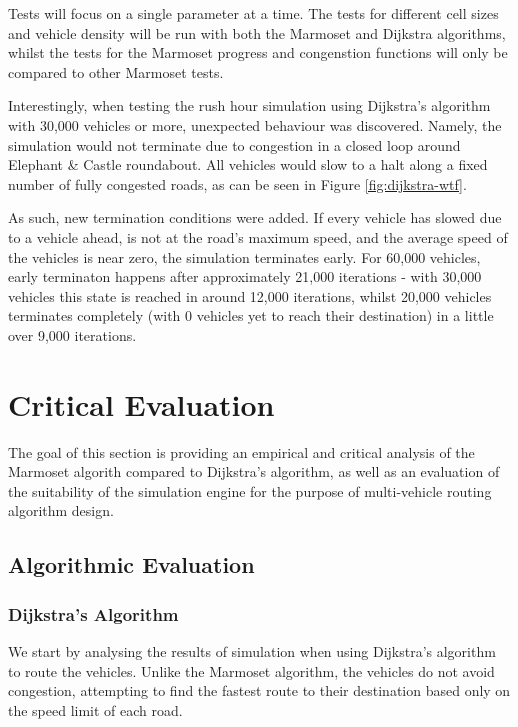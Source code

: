 \documentclass[ %
                    author={Alexander Hill},
                supervisor={Dr. Benjamin Sach},
                    degree={MEng},
                     title={MARMOSET},
                  subtitle={Multi-Agent Route Management using Online Simulation for Efficient Transportation},
                      type={research},
                      year={2016} ]{dissertation}
\begin{document}
Tests will focus on a single parameter at a time. The tests for different cell
sizes and vehicle density will be run with both the Marmoset and Dijkstra
algorithms, whilst the tests for the Marmoset progress and congenstion functions
will only be compared to other Marmoset tests.

Interestingly, when testing the rush hour simulation using Dijkstra's algorithm
with 30,000 vehicles or more, unexpected behaviour was discovered. Namely, the
simulation would not terminate due to congestion in a closed loop around
Elephant \& Castle roundabout. All vehicles would slow to a halt along a fixed
number of fully congested roads, as can be seen in Figure \ref{fig:dijkstra-wtf}.

As such, new termination conditions were added. If every vehicle has slowed due
to a vehicle ahead, is not at the road's maximum speed, and the average speed of
the vehicles is near zero, the simulation terminates early. For 60,000 vehicles,
early terminaton happens after approximately 21,000 iterations - with 30,000
vehicles this state is reached in around 12,000 iterations, whilst 20,000
vehicles terminates completely (with 0 vehicles yet to reach their destination)
in a little over 9,000 iterations.


\chapter{Critical Evaluation}
\label{chap:evaluation}

The goal of this section is providing an empirical and critical analysis of the
Marmoset algorith compared to Dijkstra's algorithm, as well as an evaluation of
the suitability of the simulation engine for the purpose of multi-vehicle
routing algorithm design.

\section{Algorithmic Evaluation}

\subsection{Dijkstra's Algorithm}\label{sec:density}

We start by analysing the results of simulation when using Dijkstra's algorithm to
route the vehicles. Unlike the Marmoset algorithm, the vehicles do not avoid
congestion, attempting to find the fastest route to their destination based only
on the speed limit of each road.
\end{document}
